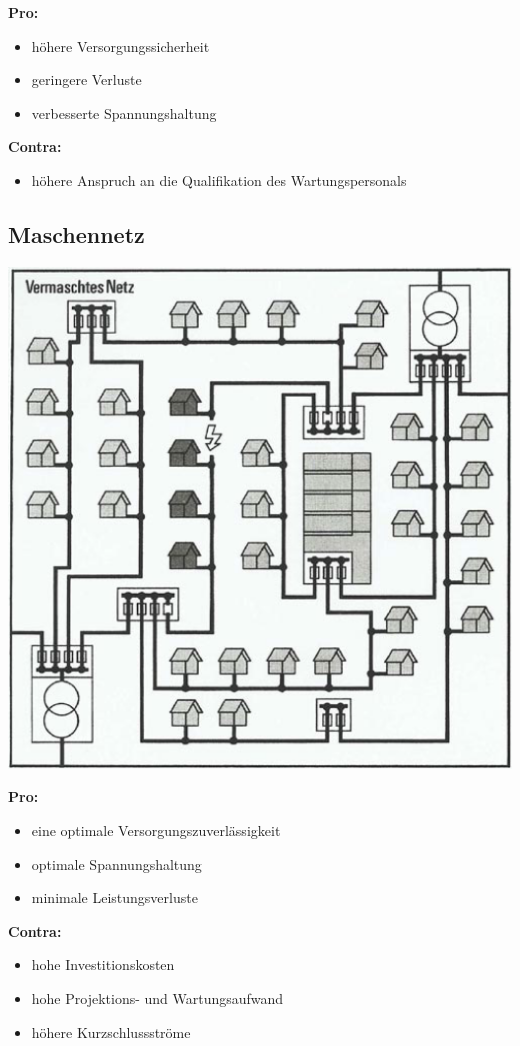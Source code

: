 \textbf{Pro:}
\begin{itemize}
    \item höhere Versorgungssicherheit
    \item geringere Verluste
    \item verbesserte Spannungshaltung
\end{itemize}

\vspace{1em}
\textbf{Contra:}
\begin{itemize}
    \item höhere Anspruch an die Qualifikation des Wartungspersonals
\end{itemize}

\subsection{Maschennetz}

\includegraphics[width=0.55\columnwidth, align=c]{images/Maschennetz.png}

\textbf{Pro:}
\begin{itemize}
    \item eine optimale Versorgungszuverlässigkeit
    \item optimale Spannungshaltung
    \item minimale Leistungsverluste
\end{itemize}

\vspace{1em}
\textbf{Contra:}
\begin{itemize}
    \item hohe Investitionskosten
    \item hohe Projektions- und Wartungsaufwand
    \item höhere Kurzschlussströme
\end{itemize}













